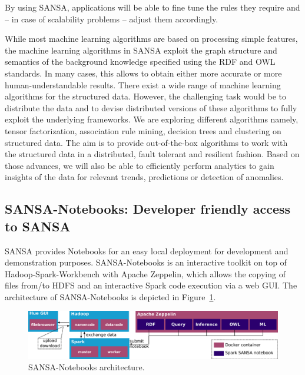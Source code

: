 By using SANSA, applications will be able to fine tune the rules they require and -- in case of scalability problems -- adjust them accordingly.

While most machine learning algorithms are based on processing simple features, the machine learning algorithms in SANSA exploit the graph structure and semantics of the background knowledge specified using the RDF and OWL standards. 
In many cases, this allows to obtain either more accurate or more human-understandable results.
There exist a wide range of machine learning algorithms for the structured data. 
However, the challenging task would be to distribute the data and to devise distributed versions of these algorithms to fully exploit the underlying frameworks. 
We are exploring different algorithms namely, tensor factorization, association rule mining, decision trees and clustering on structured data. 
The aim is to provide out-of-the-box algorithms to work with the structured data in a distributed, fault tolerant and resilient fashion.
Based on those advances, we will also be able to efficiently perform analytics to gain insights of the data for relevant trends, predictions or detection of anomalies.

\subsection{SANSA-Notebooks: Developer friendly access to SANSA}

SANSA provides Notebooks for an easy local deployment for development and demonstration purposes.
SANSA-Notebooks is an interactive toolkit on top of Hadoop-Spark-Workbench with Apache Zeppelin, which allows the copying of files from/to HDFS and an interactive Spark code execution via a web GUI.
The architecture of SANSA-Notebooks is depicted in Figure~\ref{fig:notebooks_arch}.

\begin{figure}
    \centering
    \includegraphics[width=\textwidth]{images/7_implemenation_and_usecases/SANSA-Notebook-architecture.pdf}
    \caption{SANSA-Notebooks architecture.}
    \label{fig:notebooks_arch}
\end{figure}

